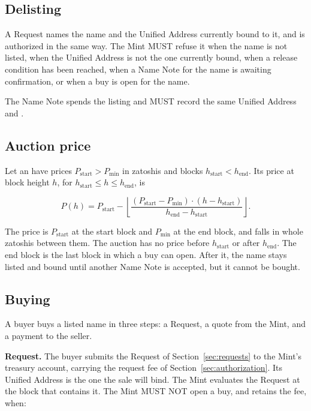 \subsection{Delisting}

A  Request names the name and the Unified Address currently bound to it, and is authorized in the same way. The Mint MUST refuse it when the name is not listed, when the Unified Address is not the one currently bound, when a release condition has been reached, when a Name Note for the name is awaiting confirmation, or when a buy is open for the name.

The  Name Note spends the listing and MUST record the same Unified Address and .

\subsection{Auction price}

Let an  have prices $P_{\text{start}} > P_{\text{min}}$ in zatoshis and blocks $h_{\text{start}} < h_{\text{end}}$. Its price at block height $h$, for $h_{\text{start}} \le h \le h_{\text{end}}$, is

$$P(h) = P_{\text{start}} - \left\lfloor \frac{(P_{\text{start}} - P_{\text{min}}) \cdot (h - h_{\text{start}})}{h_{\text{end}} - h_{\text{start}}} \right\rfloor .$$

The price is $P_{\text{start}}$ at the start block and $P_{\text{min}}$ at the end block, and falls in whole zatoshis between them. The auction has no price before $h_{\text{start}}$ or after $h_{\text{end}}$. The end block is the last block in which a buy can open. After it, the name stays listed and bound until another Name Note is accepted, but it cannot be bought.

\subsection{Buying}

A buyer buys a listed name in three steps: a  Request, a quote from the Mint, and a payment to the seller.

\textbf{Request.} The buyer submits the  Request of Section~\ref{sec:requests} to the Mint's treasury account, carrying the request fee of Section~\ref{sec:authorization}. Its Unified Address is the one the sale will bind. The Mint evaluates the Request at the block that contains it. The Mint MUST NOT open a buy, and retains the fee, when:

